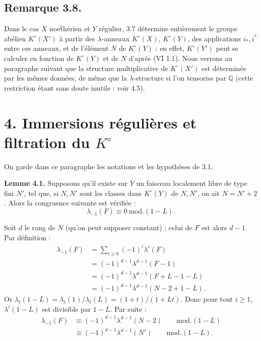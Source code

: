 \subsection*{Remarque 3.8.}

Dans le cas \(X\) noe\"{t}hérien et \(Y\) régulier, 3.7 détermine entièrement le groupe abélien \(K^\circ(X')\) à partir des \(\lambda\)-anneaux \(K^\circ(X)\), \(K^\circ(Y)\), des applications \(i_*,i^*\) entre ces anneaux, et de l'élément \(N\) de \(K^\circ(Y)\) : en effet, \(K^\circ(Y')\) peut se calculer en fonction de \(K^\circ(Y)\) et de \(N\) d'après (VI 1.1). Nous verrons au paragraphe suivant que la structure multiplicative de \(K^\circ(X')\) est déterminée par les mêmes données, de même que la \(\lambda\)-structure si l'on tensorise par \(\mathbb Q\) (cette restriction étant sans doute inutile : voir 4.5).

\section*{4. Immersions régulières et filtration du \(K^\circ\)}

On garde dans ce paragraphe les notations et les hypothèses de 3.1.

\textbf{Lemme 4.1.} Supposons qu'il existe sur \(Y\) un faisceau localement libre de type fini \(N'\), tel que, si \(N,N'\) sont les classes dans \(K^\circ(Y)\) de \(N,N'\), on ait \(N=N'+2\). Alors la congruence suivante est vérifiée :
\[
  \lambda_{-1}(F)\equiv 0 \ \mathrm{mod.}(1-L).
\]

Soit \(d\) le rang de \(N\) (qu'on peut supposer constant) ; celui de \(F\) est alors \(d-1\). Par définition :
\[
\begin{aligned}
\lambda_{-1}(F)
 &= \sum_{i\ge0}(-1)^i\lambda^i(F)\\
 &= (-1)^{d-1}\lambda^{d-1}(F-1)\\
 &= (-1)^{d-1}\lambda^{d-1}(F+L-1-L)\\
 &= (-1)^{d-1}\lambda^{d-1}(N-2+1-L).
\end{aligned}
\]
Or \(\lambda_t(1-L)=\lambda_t(1)/\lambda_t(L)=(1+t)/(1+Lt)\). Donc pour tout \(i\ge1\), \(\lambda^i(1-L)\) est divisible par \(1-L\). Par suite :
\[
\begin{aligned}
\lambda_{-1}(F)
  &\equiv (-1)^{d-1}\lambda^{d-1}(N-2) \qquad\mathrm{mod.}(1-L)\\
  &\equiv(-1)^{d-1}\lambda^{d-1}(N') \qquad\mathrm{mod.}(1-L).
\end{aligned}
\]
